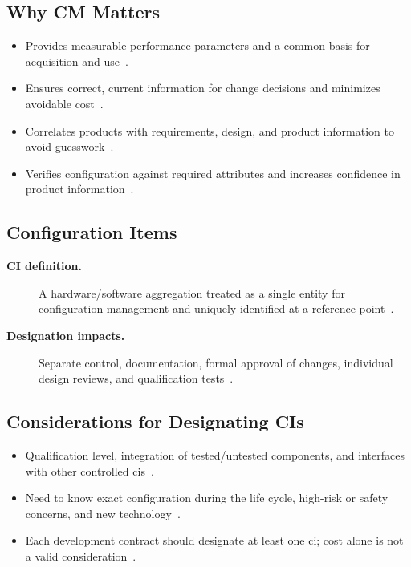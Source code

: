 \documentclass[../main.tex]{subfiles}
\begin{document}
\subsection{Why CM Matters}
\begin{itemize}
  \item Provides measurable performance parameters and a common basis for acquisition and use~\autocite{edo-3-5-3-cm-tech-reviews-2025}.
  \item Ensures correct, current information for change decisions and minimizes avoidable cost~\autocite{edo-3-5-3-cm-tech-reviews-2025}.
  \item Correlates products with requirements, design, and product information to avoid guesswork~\autocite{edo-3-5-3-cm-tech-reviews-2025}.
  \item Verifies configuration against required attributes and increases confidence in product information~\autocite{edo-3-5-3-cm-tech-reviews-2025}.
\end{itemize}

\subsection{Configuration Items}
\begin{description}
  \item[\textbf{CI definition.}] A hardware/software aggregation treated as a single entity for configuration management and uniquely identified at a reference point~\autocite{edo-3-5-3-cm-tech-reviews-2025}.
  \item[\textbf{Designation impacts.}] Separate control, documentation, formal approval of changes, individual design reviews, and qualification tests~\autocite{edo-3-5-3-cm-tech-reviews-2025}.
\end{description}

\subsection{Considerations for Designating CIs}
\begin{itemize}
  \item Qualification level, integration of tested/untested components, and interfaces with other controlled \acp{ci}~\autocite{edo-3-5-3-cm-tech-reviews-2025}.
  \item Need to know exact configuration during the life cycle, high-risk or safety concerns, and new technology~\autocite{edo-3-5-3-cm-tech-reviews-2025}.
  \item Each development contract should designate at least one \ac{ci}; cost alone is not a valid consideration~\autocite{edo-3-5-3-cm-tech-reviews-2025}.
\end{itemize}
\end{document}
